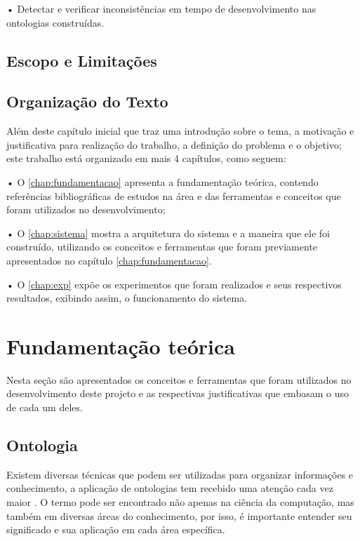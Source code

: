 \documentclass{bcc}
\begin{document}
•	Detectar e verificar inconsistências em tempo de desenvolvimento nas ontologias construídas.


\section{Escopo e Limitações}

\section{Organização do Texto}

Além deste capítulo inicial que traz uma introdução sobre o tema, a motivação e justificativa para realização do trabalho, a definição do problema e o objetivo; este trabalho está organizado em mais 4 capítulos, como seguem:

• O \autoref{chap:fundamentacao} apresenta a fundamentação teórica, contendo referências bibliográficas de estudos na área e das ferramentas e conceitos que foram utilizados no desenvolvimento;

• O \autoref{chap:sistema} mostra a arquitetura do sistema e a maneira que ele foi construído, utilizando os conceitos e ferramentas que foram previamente apresentados no capítulo \autoref{chap:fundamentacao}.

• O \autoref{chap:exp} expõe os experimentos que foram realizados e seus respectivos resultados, exibindo assim, o funcionamento do sistema.


\chapter{Fundamentação teórica}
\label{chap:fundamentacao}

Nesta seção são apresentados os conceitos e ferramentas que foram utilizados no desenvolvimento deste projeto e as respectivas justificativas que embasam o uso de cada um deles.

\section{Ontologia}

Existem diversas técnicas que podem ser utilizadas para organizar informações e conhecimento, a aplicação de ontologias tem recebido uma atenção cada vez maior \cite{almeida2014}. O termo pode ser encontrado não apenas na ciência da computação, mas também em diversas áreas do conhecimento, por isso, é importante entender seu significado e sua aplicação em cada área específica.
\end{document}
